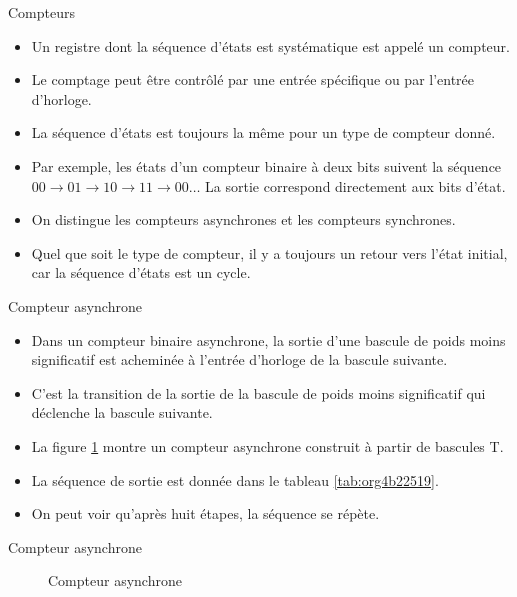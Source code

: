 \documentclass[presentation]{beamer}
\begin{document}
\begin{frame}[label={sec:org035937a}]{Compteurs}
\begin{itemize}
\item Un registre dont la séquence d'états est systématique est appelé un \alert{compteur}.

\item Le comptage peut être contrôlé par une entrée spécifique ou par l'entrée d'horloge.

\item La séquence d'états est toujours la même pour un type de compteur donné.

\item Par exemple, les états d'un compteur binaire à deux bits suivent la séquence \(00 \rightarrow 01 \rightarrow 10 \rightarrow 11 \rightarrow 00 \ldots\) La sortie correspond directement aux bits d'état.

\item On distingue les compteurs \alert{asynchrones} et les compteurs \alert{synchrones}.

\item Quel que soit le type de compteur, il y a toujours un retour vers l'état initial, car la séquence d'états est un cycle.
\end{itemize}
\end{frame}

\begin{frame}[label={sec:org0240892}]{Compteur asynchrone}
\begin{itemize}
\item Dans un compteur binaire asynchrone, la sortie d'une bascule de poids moins significatif est acheminée à l'entrée d'horloge de la bascule suivante.

\item C'est la transition de la sortie de la bascule de poids moins significatif qui déclenche la bascule suivante.

\item La figure \ref{fig:org981a45a} montre un compteur asynchrone construit à partir de bascules T.

\item La séquence de sortie est donnée dans le tableau \ref{tab:org4b22519}.

\item On peut voir qu'après huit étapes, la séquence se répète.
\end{itemize}
\end{frame}

\begin{frame}[label={sec:orgd1854c0}]{Compteur asynchrone}
\begin{figure}[htbp]
\centering

\caption{\label{fig:org981a45a}Compteur asynchrone}
\end{figure}
\end{frame}
\end{document}

